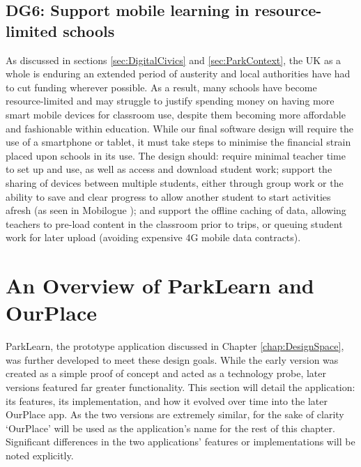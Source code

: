 \subsection*{ DG6: Support mobile learning in resource-limited schools }
\label{DG6}

As discussed in sections \ref{sec:DigitalCivics} and \ref{sec:ParkContext}, the UK as a whole is enduring an extended period of austerity and local authorities have had to cut funding wherever possible. As a result, many schools have become resource-limited and may struggle to justify spending money on having more smart mobile devices for classroom use, despite them becoming more affordable and fashionable within education. While our final software design will require the use of a smartphone or tablet, it must take steps to minimise the financial strain placed upon schools in its use. The design should: require minimal teacher time to set up and use, as well as access and download student work; support the sharing of devices between multiple students, either through group work or the ability to save and clear progress to allow another student to start activities afresh (as seen in Mobilogue \citep{Giemza2013}); and support the offline caching of data, allowing teachers to pre-load content in the classroom prior to trips, or queuing student work for later upload (avoiding expensive 4G mobile data contracts).

\section{An Overview of ParkLearn and OurPlace}

ParkLearn, the prototype application discussed in Chapter \ref{chap:DesignSpace}, was further developed to meet these design goals. While the early version was created as a simple proof of concept and acted as a technology probe, later versions featured far greater functionality. This section will detail the application: its features, its implementation, and how it evolved over time into the later OurPlace app. As the two versions are extremely similar, for the sake of clarity `OurPlace' will be used as the application's name for the rest of this chapter. Significant differences in the two applications' features or implementations will be noted explicitly.

